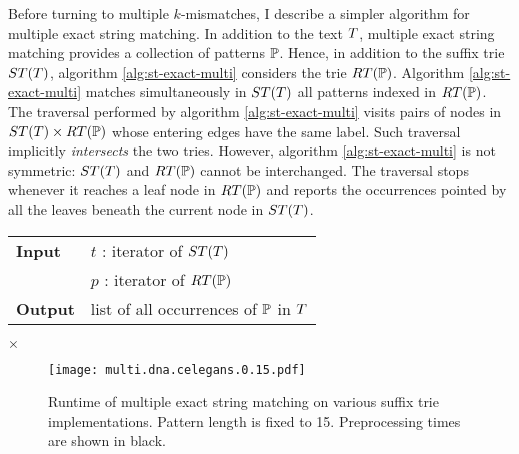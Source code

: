 Before turning to multiple $k$-mismatches, I describe a simpler algorithm for multiple exact string matching.
In addition to the text $T$, multiple exact string matching provides a collection of patterns $\mathbb{P}$.
Hence, in addition to the suffix trie $ST(T)$, algorithm \ref{alg:st-exact-multi} considers the trie $RT(\mathbb{P})$.
Algorithm \ref{alg:st-exact-multi} matches simultaneously in $ST(T)$ all patterns indexed in $RT(\mathbb{P})$.
The traversal performed by algorithm \ref{alg:st-exact-multi} visits pairs of nodes in $ST(T) \times RT(\mathbb{P})$ whose entering edges have the same label.
Such traversal implicitly \emph{intersects} the two tries.
However, algorithm \ref{alg:st-exact-multi} is not symmetric: $ST(T)$ and $RT(\mathbb{P})$ cannot be interchanged.
The traversal stops whenever it reaches a leaf node in $RT(\mathbb{P})$ and reports the occurrences pointed by all the leaves beneath the current node in $ST(T)$.

\begin{figure*}[t]
\begin{center}
\begin{minipage}[t]{.8\textwidth}
\begin{algorithm}[H]
\begin{tabular}{ll}
\textbf{Input}  & $t$ : iterator of $ST(T)$\\
 			    & $p$ : iterator of $RT(\mathbb{P})$\\
\textbf{Output} & list of all occurrences of $\mathbb{P}$ in $T$\\
\end{tabular}
\begin{algorithmic}[1]
	\State \Report {} $\times$ 
\Else
	\State {}
	\Repeat
			\State {}
			\State {}
		\EndIf
\EndIf
\end{algorithmic}
\label{alg:st-exact-multi}
\end{algorithm}
\end{minipage}
\end{center}
\end{figure*}

\begin{figure}[b]
\begin{center}
\caption[Multiple exact string matching runtime]{Runtime of multiple exact string matching on various suffix trie implementations. Pattern length is fixed to 15. Preprocessing times are shown in black.}
\label{fig:query-dna-exact-multi}
\texttt{[image: multi.dna.celegans.0.15.pdf]}
\end{center}
\end{figure}

